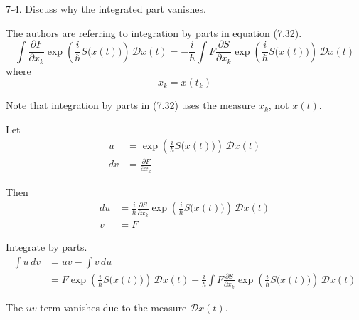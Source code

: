 \documentclass[12pt]{article}
\begin{document}
7-4.
Discuss why the integrated part vanishes.

\bigskip
The authors are referring to integration by parts in equation (7.32).
\begin{equation*}
\int\frac{\partial F}{\partial x_k}
\exp\left(\frac{i}{\hbar}S\big(x(t)\big)\right)\,\mathcal Dx(t)
=
-\frac{i}{\hbar}\int F\frac{\partial S}{\partial x_k}
\exp\left(\frac{i}{\hbar}S\big(x(t)\big)\right)\,\mathcal Dx(t)
\tag{7.32}
\end{equation*}
where
\begin{equation*}
x_k=x(t_k)
\end{equation*}

Note that integration by parts in (7.32) uses the measure $x_k$, not $x(t)$.

\bigskip
Let
\begin{align*}
u&=\exp\left(\frac{i}{\hbar}S\big(x(t)\big)\right)\,\mathcal Dx(t)
\\
dv&=\frac{\partial F}{\partial x_k}
\end{align*}

Then
\begin{align*}
du&=\frac{i}{\hbar}
\frac{\partial S}{\partial x_k}
\exp\left(\frac{i}{\hbar}S\big(x(t)\big)\right)
\,\mathcal Dx(t)
\\
v&=F
\end{align*}

Integrate by parts.
\begin{align*}
\int u\,dv&=uv-\int v\,du
\\
&=F\exp\left(\frac{i}{\hbar}S\big(x(t)\big)\right)\,\mathcal Dx(t)
-\frac{i}{\hbar}\int F
\frac{\partial S}{\partial x_k}
\exp\left(\frac{i}{\hbar}S\big(x(t)\big)\right)
\,\mathcal Dx(t)
\end{align*}

The $uv$ term vanishes due to the measure $\mathcal Dx(t)$.
\end{document}

